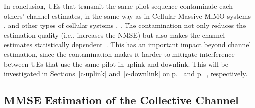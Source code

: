 In conclusion, UEs that transmit the same pilot sequence contaminate each others' channel estimates, in the same way as in Cellular Massive MIMO systems \cite{Marzetta2010a}, \cite{Sanguinetti2019a} and other types of cellular systems \cite{Niemela2004a}, \cite{Sapienza2001a}. The contamination not only reduces the estimation quality (i.e., increases the NMSE) but also makes the channel estimates statistically dependent~\cite{Sanguinetti2019a}. This has an important impact beyond channel estimation, since the contamination makes it harder to mitigate interference between UEs that use the same pilot in uplink and downlink. This will be investigated in Sections~\ref{c-uplink} and~\ref{c-downlink} on p.~\pageref{c-uplink} and p.~\pageref{c-downlink}, respectively.



\subsection{MMSE Estimation of the Collective Channel}\label{sec:mmse-of-collective-channel}

